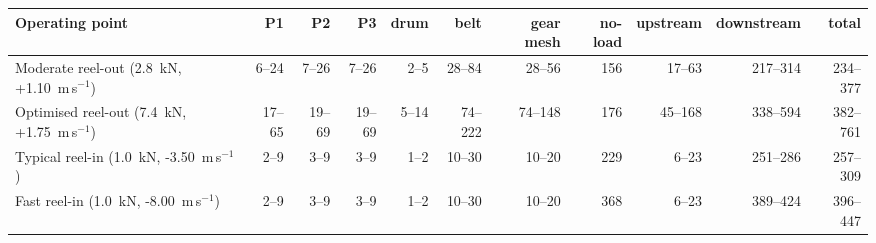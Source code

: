 \begin{tabular}{lrrrrrrrrrr}
\toprule
Operating point & P1 & P2 & P3 & drum & belt & gear mesh & no-load & upstream & downstream & total \\
\midrule
Moderate reel-out (2.8~kN, +1.10~m\,s$^{-1}$) & 6--24 & 7--26 & 7--26 & 2--5 & 28--84 & 28--56 & 156 & 17--63 & 217--314 & 234--377 \\
Optimised reel-out (7.4~kN, +1.75~m\,s$^{-1}$) & 17--65 & 19--69 & 19--69 & 5--14 & 74--222 & 74--148 & 176 & 45--168 & 338--594 & 382--761 \\
Typical reel-in (1.0~kN, -3.50~m\,s$^{-1}$) & 2--9 & 3--9 & 3--9 & 1--2 & 10--30 & 10--20 & 229 & 6--23 & 251--286 & 257--309 \\
Fast reel-in (1.0~kN, -8.00~m\,s$^{-1}$) & 2--9 & 3--9 & 3--9 & 1--2 & 10--30 & 10--20 & 368 & 6--23 & 389--424 & 396--447 \\
\bottomrule
\end{tabular}
